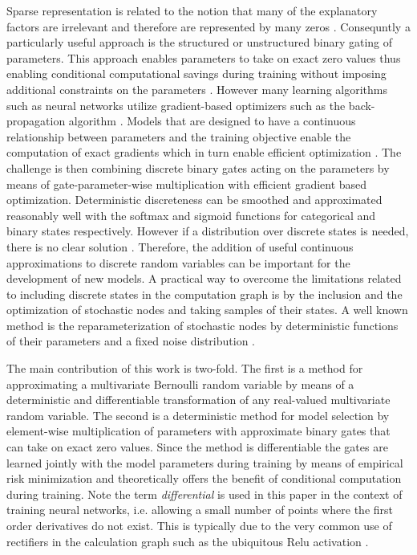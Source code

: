 \documentclass[final,1p,times]{elsarticle}
\begin{document}
Sparse representation is related to the notion that many of the explanatory factors are irrelevant and therefore are represented by many zeros \cite{journals/corr/BengioLC13}. Consequntly a particularly useful approach is the structured or unstructured binary gating of parameters. This approach enables parameters to take on exact zero values thus enabling conditional computational savings during training without imposing additional constraints on the parameters \cite{liu2018rethinking, journals/corr/BengioLC13}. However many learning algorithms such as neural networks utilize gradient-based optimizers such as the back-propagation algorithm \citep{Rumelhart:1986we}. Models that are designed to have a continuous relationship between parameters and the training objective enable the computation of exact gradients which in turn enable efficient optimization \cite{journals/corr/BengioLC13}. The challenge is then combining discrete binary gates acting on the parameters by means of gate-parameter-wise multiplication with efficient gradient based optimization. Deterministic discreteness can be smoothed and approximated reasonably well with the softmax and sigmoid functions for categorical and binary states respectively. However if a distribution over discrete states is needed, there is no clear solution \cite{maddison2016concrete, journals/corr/BengioLC13}. Therefore, the addition of useful continuous approximations to discrete random variables can be important for the development of new models. A practical way to overcome the limitations related to including discrete states in the computation graph is by the inclusion and the optimization of stochastic nodes and taking samples of their states. A well known method is the reparameterization of stochastic nodes by deterministic functions of their parameters and a fixed noise distribution \cite{Kingma2014, pmlr-v32-rezende14}.

The main contribution of this work is two-fold. The first is a method for approximating a multivariate Bernoulli random variable by means of a deterministic and differentiable transformation of any real-valued multivariate random variable. The second is a deterministic method for model selection by element-wise multiplication of parameters with approximate binary gates that can take on exact zero values. Since the method is differentiable the gates are learned jointly with the model parameters during training by means of empirical risk minimization and theoretically offers the benefit of conditional computation during training. Note the term \emph{differential} is used in this paper in the context of training neural networks, i.e. allowing a small number of points where the first order derivatives do not exist. This is typically due to the very common use of rectifiers in the calculation graph such as the ubiquitous Relu activation \cite{NairH10}.
\end{document}
